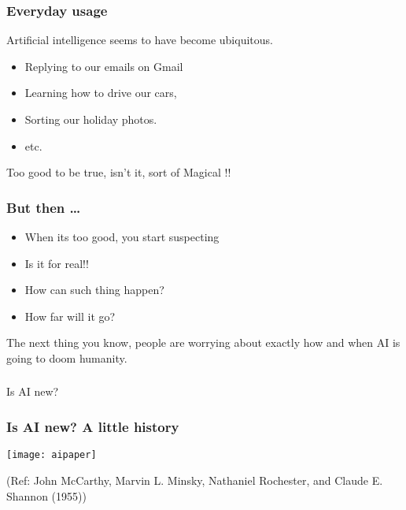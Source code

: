 

\begin{frame}[fragile]\frametitle{Everyday usage}
Artificial intelligence seems to have become ubiquitous.
\begin{itemize}
\item Replying to our emails on Gmail
\item Learning how to drive our cars,
\item Sorting our holiday photos.
\item etc.
\end{itemize}
Too good to be true, isn't it, sort of Magical !!
\end{frame}

\begin{frame}[fragile]\frametitle{But then \ldots}
\begin{itemize}
\item When its too good, you start suspecting
\item Is it for real!!
\item How can such thing happen?
\item How far will it go?
\end{itemize}
The next thing you know, people are worrying about exactly how and when AI is going to doom humanity.
\end{frame}

\begin{frame}[fragile]\frametitle{}
\begin{center}
{\Large Is AI new?}
\end{center}
\end{frame}



\begin{frame}[fragile]\frametitle{Is AI new? A little history}
\begin{center}
\texttt{[image: aipaper]}
\end{center}
{\tiny (Ref:  John McCarthy, Marvin L. Minsky, Nathaniel Rochester, and Claude E. Shannon (1955))}
\end{frame}


